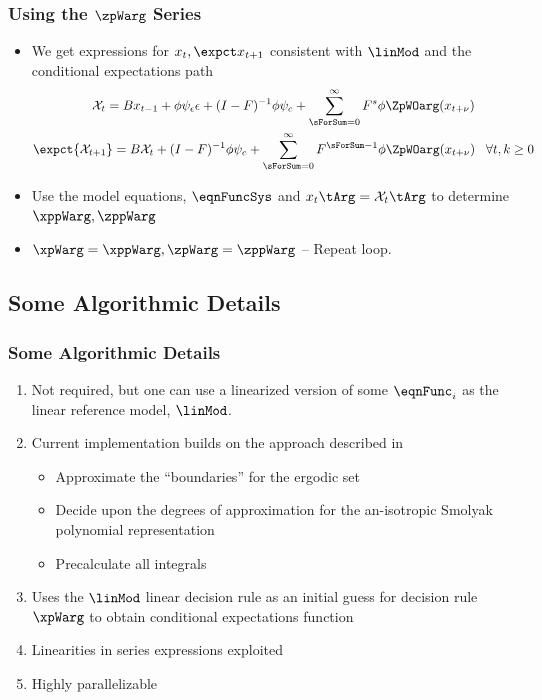 \documentclass[notheorems]{beamer}
\begin{document}
\begin{frame}
  \frametitle{Using the $\zpWarg$ Series}
{\small
  \begin{itemize}
  \item We get expressions for $x_t, \expct x_{t+1}$ consistent with $\linMod$ and the conditional expectations path
   \begin{gather*}
     \mathcal{X}_{t} =B x_{t-1}+ \phi \psi_\epsilon\epsilon + (I - F)^{-1} \phi \psi_c + \sum_{\sForSum=0}^\infty F^s \phi \ZpWOarg(x_{t+\nu})\\
	\expct{ \mathcal{X}_{t+1}} =B \mathcal{X}_{t}  + (I - F)^{-1} \phi \psi_c+ \sum_{\sForSum =0}^\infty F^{\sForSum-1} \phi \ZpWOarg(x_{t+\nu}) \,\,\,\,\,\forall t,k \ge  0
\end{gather*}
\item Use the model equations, $\eqnFuncSys$ and $x_t\tArg=\mathcal{X}_t\tArg$ to determine $\xppWarg, \zppWarg$
\item $\xpWarg=\xppWarg, \zpWarg=\zppWarg$ -- {\color{green} Repeat loop.}
  \end{itemize}
}
\end{frame}


\subsection{{Some Algorithmic Details}}


\begin{frame}
  \frametitle{Some Algorithmic Details}
  


\begin{enumerate}
\item Not required, but one can use a linearized version of some $\eqnFunc_i$  as the  linear reference model, $\linMod$.
\item Current implementation builds on the approach described in \cite{Judd2014}
  \begin{itemize}
  \item Approximate the ``boundaries'' for the ergodic set
  \item Decide upon the degrees of approximation for the an-isotropic Smolyak polynomial representation
  \item Precalculate all integrals
  \end{itemize}
\item Uses the $\linMod$ linear decision rule as an initial guess for decision rule $\xpWarg$ to obtain conditional expectations function
\item Linearities in series expressions exploited
\item Highly parallelizable 
\end{enumerate}


\end{frame}
\end{document}

